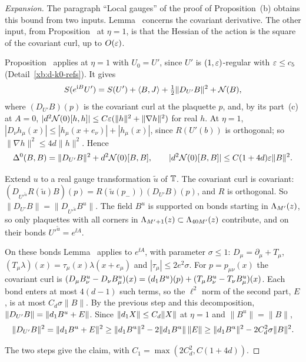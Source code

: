\begin{proof}[Expansion]
The paragraph ``Local gauges'' of the proof of Proposition~(b) obtains this bound from two inputs. Lemma~ concerns the covariant derivative. The other input, from Proposition~ at $\eta=1$, is that the Hessian of the action is the square of the covariant curl, up to $O(\varepsilon)$.

\begin{step}
Proposition~ applies at $\eta=1$ with $U_0=U'$, since $U'$ is $(1,\varepsilon)$-regular with $\varepsilon\le c_5$ (Detail~\ref{xb:d-k0-refs}). It gives
\[
S(e^{\mathrm i B}U')=S(U')+\langle B,J\rangle+\tfrac12\|D_{U'}B\|^2+\mathcal N(B),
\]
where $(D_{U'}B)(p)$ is the covariant curl at the plaquette $p$, and, by its part~(c) at $A=0$, $|d^2\mathcal N(0)[h,h]|\le C\varepsilon(\|h\|^2+\|\nabla h\|^2)$ for real $h$. At $\eta=1$, $|D_\nu h_\mu(x)|\le|h_\mu(x+e_\nu)|+|h_\mu(x)|$, since $R(U'(b))$ is orthogonal; so $\|\nabla h\|^2\le4d\|h\|^2$. Hence
\[
\Delta^0(B,B)=\|D_{U'}B\|^2+d^2\mathcal N(0)[B,B],\qquad|d^2\mathcal N(0)[B,B]|\le C(1+4d)\varepsilon\|B\|^2 .
\]
\end{step}

\begin{step}
Extend $u$ to a real gauge transformation $\tilde u$ of $\mathbb T$. The covariant curl is covariant: $(D_{U'^{\tilde u}}R(\tilde u)B)(p)=R(\tilde u(p_-))(D_{U'}B)(p)$, and $R$ is orthogonal. So $\|D_{U'}B\|=\|D_{U'^{\tilde u}}B^u\|$. The field $B^u$ is supported on bonds starting in $\Lambda_{M'}(z)$, so only plaquettes with all corners in $\Lambda_{M'+1}(z)\subset\Lambda_{40M'}(z)$ contribute, and on their bonds $U'^{\tilde u}=e^{\ii A}$.
\end{step}

\begin{step}
On these bonds Lemma~ applies to $e^{\ii A}$, with parameter $\sigma\le1$: $D_\mu=\partial_\mu+T_\mu$, $(T_\mu\lambda)(x)=\tau_\mu(x)\lambda(x+e_\mu)$ and $|\tau_\mu|\le2e^2\sigma$. For $p=p_{\mu\nu}(x)$ the covariant curl is $(D_\mu B^u_\nu-D_\nu B^u_\mu)(x)=(d_1 B^u)(p)+(T_\mu B^u_\nu-T_\nu B^u_\mu)(x)$. Each bond enters at most $4(d-1)$ such terms, so the $\ell^2$ norm of the second part, $E$, is at most $C_d\sigma\|B\|$. By the previous step and this decomposition, $\|D_{U'}B\|=\|d_1 B^u+E\|$. Since $\|d_1 X\|\le C_d\|X\|$ at $\eta=1$ and $\|B^u\|=\|B\|$,
\[
\|D_{U'}B\|^2=\|d_1 B^u+E\|^2\ge\|d_1 B^u\|^2-2\|d_1 B^u\|\,\|E\|\ge\|d_1 B^u\|^2-2C_d^2\sigma\|B\|^2 .
\]
\end{step}
The two steps give the claim, with $C_1=\max(2C_d^2,C(1+4d))$.
\end{proof}


